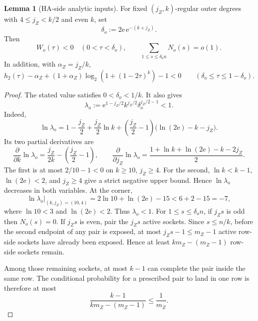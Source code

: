 \documentclass[11pt]{article}
\theoremstyle{definition}
\newtheorem{lemma}[theorem]{Lemma}
\newcommand{\h}{h_2}
\begin{document}
\begin{lemma}[HA-side analytic inputs]\label{lem:HA-inputs-jp}
For fixed \((j_Z,k)\)-regular outer degrees with \(4\le j_Z<k/2\) and even
\(k\), set
\[
\delta_o:=2\mathrm{e}\,\mathrm{e}^{-(k+j_Z)}.
\]
Then
\begin{equation*}
W_o(\tau)<0 \quad (0<\tau<\delta_o),
\qquad
\sum_{1\le s\le \delta_o n} N_o(s)=o(1).
\end{equation*}
In addition, with \(\alpha_Z=j_Z/k\),
\begin{equation*}
\h(\tau)-\alpha_Z
+(1+\alpha_Z)\log_2\!\left(1+(1-2\tau)^k\right)-1<0
\qquad (\delta_o\le\tau\le1-\delta_o).
\end{equation*}
\end{lemma}

\begin{proof}
The stated value satisfies \(0<\delta_o<1/k\). It also gives
\[
\lambda_o:=
\mathrm{e}^{1-j_Z/2}k^{j_Z/2}\delta_o^{j_Z/2-1}<1.
\]
Indeed,
\[
\ln\lambda_o
=1-\frac{j_Z}{2}+\frac{j_Z}{2}\ln k
+\left(\frac{j_Z}{2}-1\right)
 \bigl(\ln(2\mathrm{e})-k-j_Z\bigr).
\]
Its two partial derivatives are
\[
\frac{\partial}{\partial k}\ln\lambda_o
=\frac{j_Z}{2k}-\left(\frac{j_Z}{2}-1\right),
\qquad
\frac{\partial}{\partial j_Z}\ln\lambda_o
=\frac{1+\ln k+\ln(2\mathrm e)-k-2j_Z}{2}.
\]
The first is at most \(2/10-1<0\) on \(k\ge10\), \(j_Z\ge4\).
For the second, \(\ln k<k-1\), \(\ln(2\mathrm e)<2\), and \(j_Z\ge4\)
give a strict negative upper bound.  Hence \(\ln\lambda_o\) decreases
in both variables.  At the corner,
\[
\ln\lambda_o\big|_{(k,j_Z)=(10,4)}
=2\ln10+\ln(2\mathrm e)-15<6+2-15=-7,
\]
where \(\ln10<3\) and \(\ln(2\mathrm e)<2\).  Thus \(\lambda_o<1\).
For \(1\le s\le\delta_o n\), if \(j_Zs\) is odd then \(N_o(s)=0\). If \(j_Zs\) is even, pair the \(j_Zs\) active sockets. Since \(s\le n/k\), before the second endpoint of any pair is exposed, at most \(j_Zs-1\le m_Z-1\) active row-side sockets have already been exposed. Hence at least \(km_Z-(m_Z-1)\) row-side sockets remain.

Among those remaining sockets, at most \(k-1\) can complete the pair inside the same row. The conditional probability for a prescribed pair to land in one row is therefore at most
\[
\frac{k-1}{km_Z-(m_Z-1)}\le \frac1{m_Z}.
\]


\end{proof}
\end{document}
